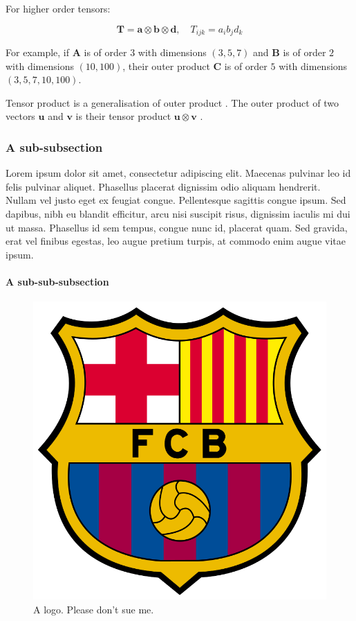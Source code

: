 \documentclass{article}
\begin{document}
For higher order tensors:

\begin{equation}
    \mathbf{T} = \mathbf{a} \otimes \mathbf{b} \otimes \mathbf{d}, \quad T_{i j k}=a_{i} b_{j} d_{k}
\end{equation}

For example, if $\mathbf{A}$ is of order $3$ with dimensions $(3, 5, 7)$ and $\mathbf{B}$ is of order $2$ with dimensions $(10, 100)$, their outer product $\mathbf{C}$ is of order $5$ with dimensions $(3, 5, 7, 10, 100)$.

Tensor product is a generalisation of outer product \cite{wiki2019tensorProd}. The outer product of two vectors $\mathbf{u}$ and $\mathbf{v}$ is their tensor product $\mathbf{u} \otimes \mathbf{v}$ \cite{wiki2019outerProd}.


\subsubsection{A sub-subsection}
\label{subsubsec: A sub-subsection}

Lorem ipsum dolor sit amet, consectetur adipiscing elit. Maecenas pulvinar leo id felis pulvinar aliquet. Phasellus placerat dignissim odio aliquam hendrerit. Nullam vel justo eget ex feugiat congue. Pellentesque sagittis congue ipsum. Sed dapibus, nibh eu blandit efficitur, arcu nisi suscipit risus, dignissim iaculis mi dui ut massa. Phasellus id sem tempus, congue nunc id, placerat quam. Sed gravida, erat vel finibus egestas, leo augue pretium turpis, at commodo enim augue vitae ipsum.


\paragraph{A sub-sub-subsection}
\label{paragraph: A sub-sub-subsection}

\begin{figure}[h]
	\begin{center}             %
        \includegraphics[width=0.2\linewidth]{images/logo2.png}
    \end{center}
    \caption[A logo.]{A logo. Please don't sue me.}
    \label{fig: Logo}          %
\end{figure}
\end{document}
